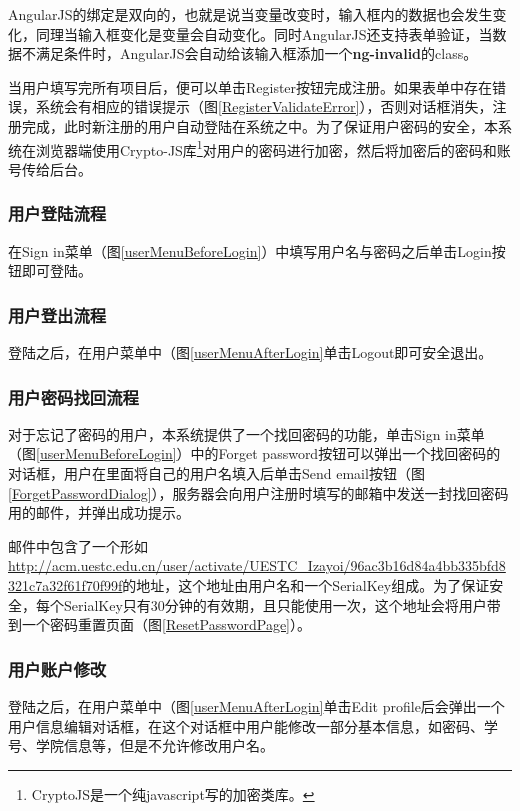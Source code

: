 %

AngularJS的绑定是双向的，也就是说当变量改变时，输入框内的数据也会发生变化，同理当输入框变化是变量会自动变化。同时AngularJS还支持表单验证，当数据不满足条件时，AngularJS会自动给该输入框添加一个\textbf{ng-invalid}的class。

当用户填写完所有项目后，便可以单击Register按钮完成注册。如果表单中存在错误，系统会有相应的错误提示（图\ref{RegisterValidateError}），否则对话框消失，注册完成，此时新注册的用户自动登陆在系统之中。为了保证用户密码的安全，本系统在浏览器端使用Crypto-JS库\footnote{CryptoJS是一个纯javascript写的加密类库。}对用户的密码进行加密，然后将加密后的密码和账号传给后台。


\subsubsection{用户登陆流程}
在Sign in菜单（图\ref{userMenuBeforeLogin}）中填写用户名与密码之后单击Login按钮即可登陆。

\subsubsection{用户登出流程}
登陆之后，在用户菜单中（图\ref{userMenuAfterLogin}单击Logout即可安全退出。

\subsubsection{用户密码找回流程}
对于忘记了密码的用户，本系统提供了一个找回密码的功能，单击Sign in菜单（图\ref{userMenuBeforeLogin}）中的Forget password按钮可以弹出一个找回密码的对话框，用户在里面将自己的用户名填入后单击Send email按钮（图\ref{ForgetPasswordDialog}），服务器会向用户注册时填写的邮箱中发送一封找回密码用的邮件，并弹出成功提示。


邮件中包含了一个形如\url{http://acm.uestc.edu.cn/user/activate/UESTC_Izayoi/96ac3b16d84a4bb335bfd8321c7a32f61f70f99f}的地址，这个地址由用户名和一个SerialKey组成。为了保证安全，每个SerialKey只有30分钟的有效期，且只能使用一次，这个地址会将用户带到一个密码重置页面（图\ref{ResetPasswordPage}）。


\subsubsection{用户账户修改}
登陆之后，在用户菜单中（图\ref{userMenuAfterLogin}单击Edit profile后会弹出一个用户信息编辑对话框，在这个对话框中用户能修改一部分基本信息，如密码、学号、学院信息等，但是不允许修改用户名。

